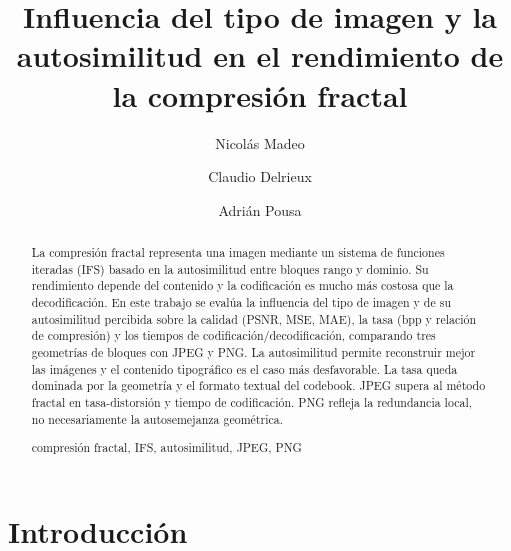 \documentclass[a4paper]{llncs}
\newcommand{\keywords}[1]{\par\addvspace\baselineskip
\noindent\keywordname\enspace\ignorespaces#1}
\begin{document}
\mainmatter  %

\title{Influencia del tipo de imagen y la autosimilitud en el rendimiento de la compresión fractal}


%
%
\author{Nicolás Madeo
\and Claudio Delrieux
\and Adrián Pousa}



\maketitle
\pagestyle{empty}
\thispagestyle{empty}

\begin{abstract}
La compresión fractal representa una imagen mediante un sistema de funciones iteradas (IFS) basado en la autosimilitud entre bloques rango y dominio. Su rendimiento depende del contenido y la codificación es mucho más costosa que la decodificación. En este trabajo se evalúa la influencia del tipo de imagen y de su autosimilitud percibida sobre la calidad (PSNR, MSE, MAE), la tasa (bpp y relación de compresión) y los tiempos de codificación/decodificación, comparando tres geometrías de bloques con JPEG y PNG. La autosimilitud permite reconstruir mejor las imágenes y el contenido tipográfico es el caso más desfavorable. La tasa queda dominada por la geometría y el formato textual del codebook. JPEG supera al método fractal en tasa-distorsión y tiempo de codificación. PNG refleja la redundancia local, no necesariamente la autosemejanza geométrica.
\keywords{compresión fractal, IFS, autosimilitud, JPEG, PNG}
\end{abstract}


\section{Introducción}
\end{document}
